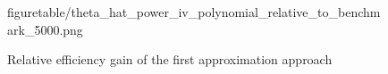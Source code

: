 \documentclass[11pt, a4paper]{article}
\begin{document}
\begin{figure}[!ht]
\begin{center}
{  {figuretable/theta_hat_power_iv_polynomial_relative_to_benchmark_5000.png}}
  \caption{Relative efficiency gain of the first approximation approach}
  \label{fg:theta_hat_power_iv_polynomial_relative_to_benchmark}
  \end{center}
\end{figure} 



\end{document}
